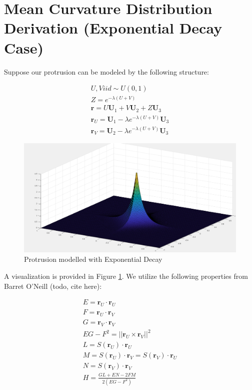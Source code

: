 \documentclass[preprint,12pt]{elsarticle}
\begin{document}
\section{Mean Curvature Distribution Derivation (Exponential Decay Case)}

Suppose our protrusion can be modeled by the following structure:

\begin{gather}
	U, V iid \sim U(0,1) \\	
	Z = e^{-\lambda(U + V)} \\
	\mathbf{r} = U \mathbf{U}_1 + V \mathbf{U}_2 + Z \mathbf{U}_3 \\
	\mathbf{r}_U = \mathbf{U}_1 - \lambda e^{-\lambda(U + V)}\mathbf{U}_3 \\
	\mathbf{r}_V = \mathbf{U}_2 - \lambda e^{-\lambda(U + V)}\mathbf{U}_3
\end{gather}

\begin{figure}
\includegraphics[width=15cm]{exp_protrusion}
\caption{Protrusion modelled with Exponential Decay}
\label{fig:exp_protrusion}
\end{figure}

A visualization is provided in Figure \ref{fig:exp_protrusion}. We utilize the following properties from Barret O'Neill (todo, cite here):

\begin{gather}
	E = \mathbf{r}_U \cdot \mathbf{r}_U \\
	F = \mathbf{r}_U \cdot \mathbf{r}_V \\
	G = \mathbf{r}_V \cdot \mathbf{r}_V \\
	EG - F^2 = ||\mathbf{r}_U \times \mathbf{r}_V||^2 \\
	L = S(\mathbf{r}_U) \cdot \mathbf{r}_U \\
	M = S(\mathbf{r}_U) \cdot \mathbf{r}_V = S(\mathbf{r}_V) \cdot \mathbf{r}_U \\
	N = S(\mathbf{r}_V) \cdot \mathbf{r}_V \\
	H = \frac{GL + EN - 2FM}{2(EG - F^2)}
\end{gather}
\end{document}

